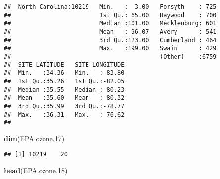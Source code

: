 \documentclass[]{article}
\newenvironment{Shaded}{\begin{snugshade}}{\end{snugshade}}
\newcommand{\KeywordTok}[1]{\textcolor[rgb]{0.13,0.29,0.53}{\textbf{#1}}}
\newcommand{\DecValTok}[1]{\textcolor[rgb]{0.00,0.00,0.81}{#1}}
\newcommand{\NormalTok}[1]{#1}
\begin{document}
\begin{verbatim}
##  North Carolina:10219   Min.   :  3.00   Forsyth    : 725  
##                         1st Qu.: 65.00   Haywood    : 700  
##                         Median :101.00   Mecklenburg: 601  
##                         Mean   : 96.07   Avery      : 541  
##                         3rd Qu.:123.00   Cumberland : 464  
##                         Max.   :199.00   Swain      : 429  
##                                          (Other)    :6759  
##  SITE_LATITUDE   SITE_LONGITUDE  
##  Min.   :34.36   Min.   :-83.80  
##  1st Qu.:35.26   1st Qu.:-82.05  
##  Median :35.55   Median :-80.23  
##  Mean   :35.60   Mean   :-80.32  
##  3rd Qu.:35.99   3rd Qu.:-78.77  
##  Max.   :36.31   Max.   :-76.62  
## 
\end{verbatim}

\begin{Shaded}
\begin{Highlighting}[]
\KeywordTok{dim}\NormalTok{(EPA.ozone.}\DecValTok{17}\NormalTok{)}
\end{Highlighting}
\end{Shaded}

\begin{verbatim}
## [1] 10219    20
\end{verbatim}

\begin{Shaded}
\begin{Highlighting}[]
\KeywordTok{head}\NormalTok{(EPA.ozone.}\DecValTok{18}\NormalTok{)}
\end{Highlighting}
\end{Shaded}
\end{document}
